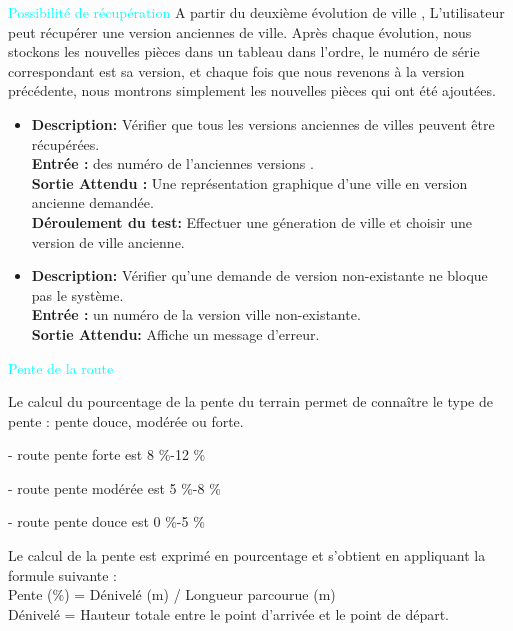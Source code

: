 \besoin{}
{\textcolor{cyan}{Possibilité de récupération} }
{ 
A partir du deuxième évolution de ville , L’utilisateur peut récupérer une version anciennes de ville. Après chaque évolution, nous stockons les nouvelles pièces dans un tableau dans l'ordre, le numéro de série correspondant est sa version, et chaque fois que nous revenons à la version précédente, nous montrons simplement les nouvelles pièces qui ont été ajoutées.
}
{}
{
\begin{itemize}
 \item  \textbf{ Description: } Vérifier que tous les versions anciennes de villes peuvent être récupérées.\\
 \textbf{ Entrée : } des numéro de l’anciennes versions . \\
 \textbf{Sortie Attendu : } Une représentation graphique d’une ville en version ancienne demandée. \\
 \textbf{Déroulement du test: } Effectuer une géneration de ville et choisir une version de ville ancienne.  
 
 \item \textbf{ Description: } Vérifier qu'une demande de version non-existante ne bloque pas le système. \\
 \textbf{Entrée : } un numéro de la version ville non-existante. \\
 \textbf{ Sortie Attendu: } Affiche un message d'erreur. 
\end{itemize}
}
\besoin{} 
{\textcolor{cyan}{Pente de la route }}
{
Le calcul du pourcentage de la pente du terrain permet de connaître le type de pente : pente douce, modérée ou forte. 

     - route pente forte est 8 \%-12 \% 

     - route pente modérée est 5 \%-8 \%

     - route pente douce est 0 \%-5 \%

Le calcul de la pente est exprimé en pourcentage et s’obtient en appliquant la formule suivante : \\

Pente (\%) = Dénivelé (m) / Longueur parcourue (m) \\

Dénivelé = Hauteur totale entre le point d'arrivée et le point de départ.
}
{}
{}